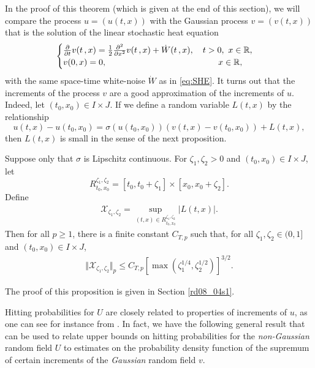 \documentclass[12pt,a4paper]{article}
\newcommand{\R}{{\mathbb{R}}}
\newcommand{\E}{\mathrm{E}}
\newcommand{\XX}{\mathcal{X}}
\newcommand{\<}{\langle}
\renewcommand{\>}{\rangle}
\begin{document}
 In the proof of this theorem (which is given at the end of this section), we will compare the process $u=(u(t, x))$ with the Gaussian process $v=(v(t, x))$ that is the solution of the linear stochastic heat equation
 \begin{align}\label{rd03_27e2}
\begin{cases}
\frac{\partial}{\partial t} v(t\,,x) =\frac{1}{2}\frac{\partial^2}{\partial x^2} v(t\,,x) + \dot{W}(t\,,x),\quad  t>0,\ x\in \R,\\
v(0, x)= 0, \hskip 1.8in x \in \R,
\end{cases}
\end{align}
with the same space-time white-noise $\dot W$ as in \eqref{eq:SHE}. It turns out that the increments of the process $v$ are a good approximation of the increments of $u$. Indeed, let $(t_0, x_0) \in I\times J$. If we define a random variable $L(t, x)$ by the relationship
\begin{equation}\label{rd03_28e1}
     u(t,x)-u(t_0,x_0) = \sigma(u(t_0,x_0))(v(t,x)-v(t_0,x_0)) + L(t,x),
\end{equation}
then $L(t, x)$ is small in the sense of the next proposition.

 
 \begin{proposition} \label{rd_prop1}
Suppose only that $\sigma$ is Lipschitz continuous. For $\zeta_1, \zeta_2 > 0$ and $(t_0, x_0)\in I \times J$, let 
\[
    R^{\zeta_1, \zeta_2}_{t_0,x_0} =  [t_0, t_0+\zeta_1]\times [x_0, x_0+\zeta_2].
\] 
Define
\begin{align*}
    \XX_{\zeta_1, \zeta_2} = \sup_{(t,x)\in R^{\zeta_1, \zeta_2}_{t_0,x_0}}  | L(t,x)|.
\end{align*}
Then for all $p\geq1$, there is a finite constant $C_{T,p}$ such that, for all $\zeta_1, \zeta_2 \in (0, 1]$ and $(t_0, x_0)\in I \times J$,
\begin{align*}\label{rd03_27e1}
   \Vert \XX_{\zeta_1, \zeta_2} \Vert_p \leq C_{T, p} \left[\max\left(\zeta_1^{1/4}, \zeta_2^{1/2}\right)\right]^{3/2}.
 \end{align*}
 \end{proposition}
 
 The proof of this proposition is given in Section \ref{rd08_04s1}. 
\medskip

\medskip

Hitting probabilities for $U$ are closely related to properties of increments of $u$, as one can see for instance from \cite[Proposition 6.5.1]{dss}. In fact, we have the following general result that can be used to relate upper bounds on hitting probabilities for the {\em non-Gaussian} random field $U$ to estimates on the probability density function of the supremum of certain increments of the {\em Gaussian} random field $v$.
\end{document}
